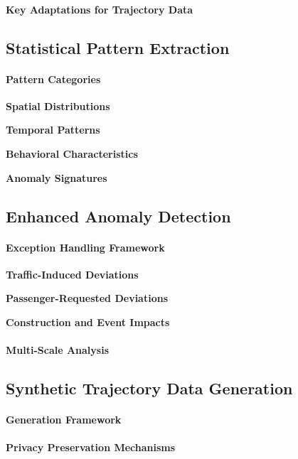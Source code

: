 \documentclass[runningheads]{llncs}
\begin{document}
\paragraph{Key Adaptations for Trajectory Data}

\subsection{Statistical Pattern Extraction}
\label{sec:pattern-extraction}

\paragraph{Pattern Categories}

\textbf{Spatial Distributions}

\textbf{Temporal Patterns}

\textbf{Behavioral Characteristics}

\textbf{Anomaly Signatures}

\subsection{Enhanced Anomaly Detection}
\label{sec:improve}

\paragraph{Exception Handling Framework}

\textbf{Traffic-Induced Deviations}

\textbf{Passenger-Requested Deviations}

\textbf{Construction and Event Impacts}

\paragraph{Multi-Scale Analysis}

\subsection{Synthetic Trajectory Data Generation}
\label{sec:synthetic}

\paragraph{Generation Framework}

\paragraph{Privacy Preservation Mechanisms}
\end{document}
